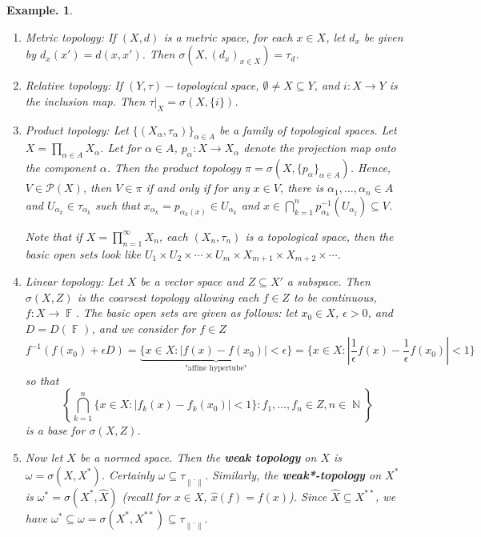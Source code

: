 \documentclass[11pt, a4paper]{memoir}
\DeclareMathOperator{\N}{{\mathbb{N}}}
\DeclareMathOperator{\F}{{\mathbb{F}}}
\newcommand{\norm}[1]{\ensuremath{\left\lVert#1\right\rVert}}
\theoremstyle{change}
\theoremstyle{plain}
\theoremstyle{nonumberplain}
\newtheorem{example}{Example.}
\numberwithin{equation}{section}
\begin{document}
\begin{example}
    \begin{enumerate}[nl,r]
        \item \textit{Metric topology:} If $(X,d)$ is a metric space, for each $x\in X$, let $d_x$ be given by $d_x(x')=d(x,x')$.
            Then $\sigma(X,(d_x)_{x\in X})=\tau_d$.
        \item \textit{Relative topology:} If $(Y,\tau)-$topological space, $\emptyset\neq X\subseteq Y$, and $i:X\to Y$ is the inclusion map.
            Then $\tau|_X=\sigma(X,\{i\})$.
        \item \textit{Product topology:} Let $\{(X_\alpha,\tau_\alpha)\}_{\alpha\in A}$ be a family of topological spaces.
            Let $X=\prod_{\alpha\in A}X_\alpha$.
            Let for $\alpha\in A$, $p_\alpha:X\to X_\alpha$ denote the projection map onto the component $\alpha$.
            Then the product topology $\pi=\sigma(X,\{p_\alpha\}_{\alpha\in A})$.
            Hence, $V\in\mathcal{P}(X)$, then $V\in\pi$ if and only if for any $x\in V$, there is $\alpha_1,\ldots,\alpha_n\in A$ and $U_{\alpha_k}\in\tau_{\alpha_k}$ such that $x_{\alpha_k}=p_{\alpha_k(x)}\in U_{\alpha_k}$ and $x\in \bigcap_{k=1}^n p_{\alpha_k}^{-1}(U_{\alpha_j})\subseteq V$.

            Note that if $X=\prod_{n=1}^\infty X_n$, each $(X_n,\tau_n)$ is a topological space, then the basic open sets look like $U_1\times U_2\times\cdots\times U_m\times X_{m+1}\times X_{m+2}\times\cdots$.
        \item \textit{Linear topology:} Let $X$ be a vector space and $Z\subseteq X'$ a subspace.
            Then $\sigma(X,Z)$ is the coarsest topology allowing each $f\in Z$ to be continuous, $f:X\to\F$.
            The basic open sets are given as follows: let $x_0\in X$, $\epsilon>0$, and $D=D(\F)$, and we consider for $f\in Z$
            \begin{equation*}
                f^{-1}(f(x_0)+\epsilon D)=\underbrace{\{x\in X:|f(x)-f(x_0)|<\epsilon\}}_{\text{"affine hypertube"}}=\{x\in X:|\frac{1}{\epsilon}f(x)-\frac{1}{\epsilon}f(x_0)|<1\}
            \end{equation*}
            so that
            \begin{equation*}
                \left\{\bigcap_{k=1}^n\{x\in X:|f_k(x)-f_k(x_0)|<1\}:f_1,\ldots,f_n\in Z,n\in\N\right\}
            \end{equation*}
            is a base for $\sigma(X,Z)$.
        \item Now let $X$ be a normed space.
            Then the \textbf{weak topology} on $X$ is $\omega=\sigma(X,X^*)$.
            Certainly $\omega\subseteq\tau_{\norm{\cdot}}$.
            Similarly, the \textbf{weak*-topology} on $X^*$ is $\omega^*=\sigma(X^*,\hat X)$ (recall for $x\in X$, $\hat x(f)=f(x)$).
            Since $\hat X\subseteq X^{**}$, we have $\omega^*\subseteq\omega=\sigma(X^*,X^{**})\subseteq\tau_{\norm{\cdot}}$.
    \end{enumerate}
\end{example}
\end{document}
